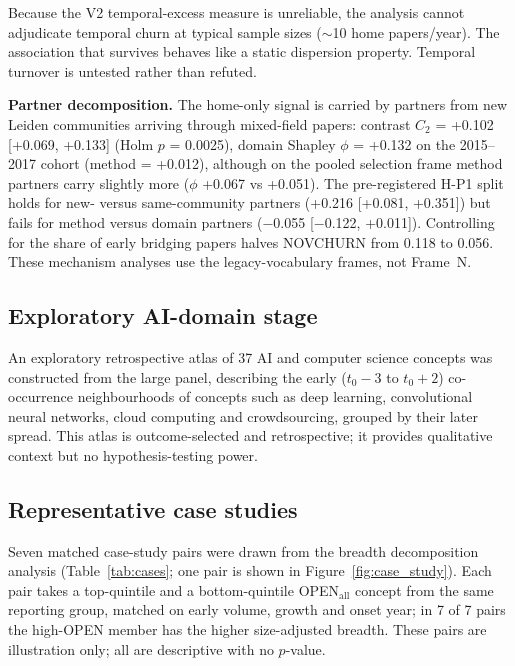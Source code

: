 \documentclass[11pt,letterpaper]{article}
\begin{document}
Because the V2 temporal-excess measure is unreliable, the analysis cannot adjudicate temporal churn at typical sample sizes ($\sim$10 home papers/year). The association that survives behaves like a static dispersion property. Temporal turnover is untested rather than refuted.

\textbf{Partner decomposition.} The home-only signal is carried by partners from new Leiden communities arriving through mixed-field papers: contrast $C_2$ = +0.102 [+0.069, +0.133] (Holm $p$ = 0.0025), domain Shapley $\phi$ = +0.132 on the 2015--2017 cohort (method = +0.012), although on the pooled selection frame method partners carry slightly more ($\phi$ +0.067 vs +0.051). The pre-registered H-P1 split holds for new- versus same-community partners (+0.216 [+0.081, +0.351]) but fails for method versus domain partners ($-$0.055 [$-$0.122, +0.011]). Controlling for the share of early bridging papers halves NOVCHURN from 0.118 to 0.056. These mechanism analyses use the legacy-vocabulary frames, not Frame~N.


\subsection{Exploratory AI-domain stage}

An exploratory retrospective atlas of 37 AI and computer science concepts was constructed from the large panel, describing the early ($t_0{-}3$ to $t_0{+}2$) co-occurrence neighbourhoods of concepts such as deep learning, convolutional neural networks, cloud computing and crowdsourcing, grouped by their later spread. This atlas is outcome-selected and retrospective; it provides qualitative context but no hypothesis-testing power.


\subsection{Representative case studies}

Seven matched case-study pairs were drawn from the breadth decomposition analysis (Table~\ref{tab:cases}; one pair is shown in Figure~\ref{fig:case_study}). Each pair takes a top-quintile and a bottom-quintile OPEN$_{\text{all}}$ concept from the same reporting group, matched on early volume, growth and onset year; in 7 of 7 pairs the high-OPEN member has the higher size-adjusted breadth. These pairs are illustration only; all are descriptive with no $p$-value.
\end{document}
